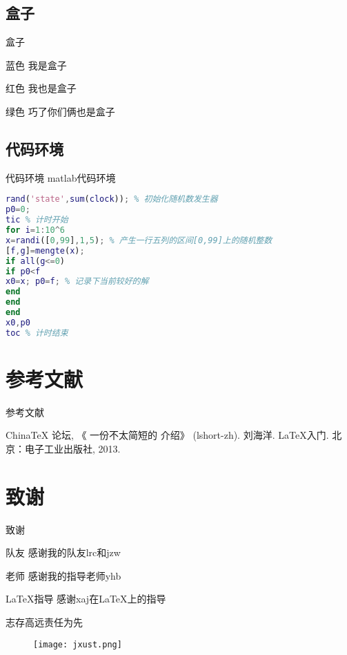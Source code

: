 \documentclass{jxustbeamer}
\begin{document}
\subsection{盒子}
\begin{frame}{盒子}
	\begin{block}{蓝色}
		我是盒子
	\end{block}

    \begin{alertblock}{红色}
    	我也是盒子
    \end{alertblock}

    \begin{exampleblock}{绿色}
    	巧了你们俩也是盒子
    \end{exampleblock}
\end{frame}

\subsection{代码环境}
\begin{frame}[fragile]{代码环境}
	matlab代码环境
\begin{lstlisting}[language=matlab]
rand('state',sum(clock)); % 初始化随机数发生器
p0=0;
tic % 计时开始
for i=1:10^6
x=randi([0,99],1,5); % 产生一行五列的区间[0,99]上的随机整数
[f,g]=mengte(x);
if all(g<=0)
if p0<f
x0=x; p0=f; % 记录下当前较好的解
end
end
end
x0,p0
toc % 计时结束
\end{lstlisting}
\end{frame}
\section{参考文献}
\begin{frame}{参考文献}
	\begin{thebibliography}{99}
		 China\TeX{} 论坛, 《 一份不太简短的 \LaTeXe{} 介绍》 (lshort-zh).
		 刘海洋. LaTeX入门. 北京：电子工业出版社, 2013.
	\end{thebibliography}
\end{frame}
\section{致谢}
\begin{frame}{致谢}
    \begin{block}{队友}
    	\centering
    	感谢我的队友lrc和jzw
    \end{block}
    \pause
    \begin{block}{老师}
    	\centering
    	感谢我的指导老师yhb
    \end{block}
    \pause
    \begin{block}{\LaTeX{}指导}
    	\centering
    	感谢xaj在\LaTeX{}上的指导
    \end{block}
    \pause
	\begin{center}
		志存高远\hspace{1pc}责任为先
	\end{center}
    \pause
    \begin{figure}[h]
    	\centering
    	\texttt{[image: jxust.png]}
    \end{figure}
\end{frame}
\end{document}
